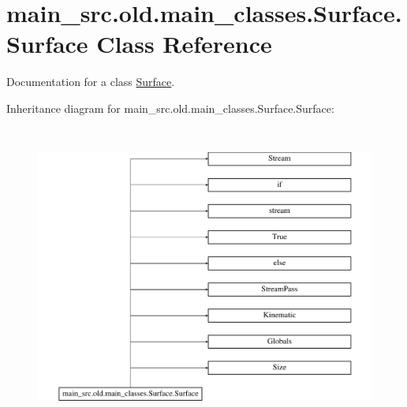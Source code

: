 \hypertarget{classmain__src_8old_1_1main__classes_1_1Surface_1_1Surface}{\section{main\-\_\-src.\-old.\-main\-\_\-classes.\-Surface.\-Surface Class Reference}
\label{classmain__src_8old_1_1main__classes_1_1Surface_1_1Surface}
}


Documentation for a class \hyperlink{classmain__src_8old_1_1main__classes_1_1Surface_1_1Surface}{Surface}.  


Inheritance diagram for main\-\_\-src.\-old.\-main\-\_\-classes.\-Surface.\-Surface\-:\begin{figure}[H]
\begin{center}
\leavevmode
\includegraphics[height=10.000000cm]{classmain__src_8old_1_1main__classes_1_1Surface_1_1Surface}
\end{center}
\end{figure}
